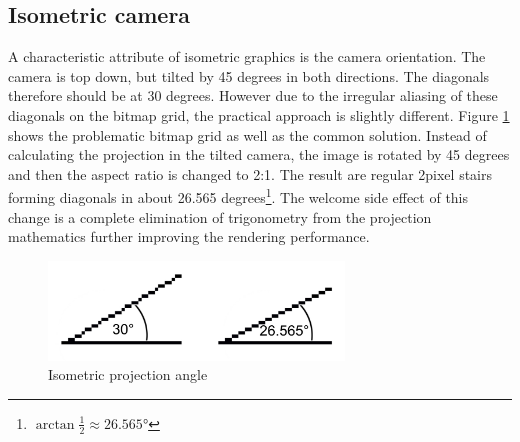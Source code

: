 \documentclass[11pt,oneside, final]{fithesis2}
\begin{document}
\subsection{Isometric camera}
A characteristic attribute of isometric graphics is the camera orientation. The camera is top down, but tilted by 45 degrees in both directions. The diagonals therefore should be at 30 degrees. However due to the irregular aliasing of these diagonals on the bitmap grid, the practical approach is slightly different. Figure \ref{isoangle} shows the problematic bitmap grid as well as the common solution. Instead of calculating the projection in the tilted camera, the image is rotated by 45 degrees and then the aspect ratio is changed to 2:1\cite{pagella}. The result are regular 2pixel stairs forming diagonals in about 26.565 degrees\footnote{\begin{math}\arctan \frac{1}{2} \approx 26.565\si{\degree}\end{math}}. The welcome side effect of this change is a complete elimination of trigonometry from the projection mathematics further improving the rendering performance.

\begin{figure}[h]
	\centering
	\includegraphics[width=0.7\textwidth]{thesis-angles}
	\caption{Isometric projection angle}
	\label{isoangle}
\end{figure}
\end{document}
